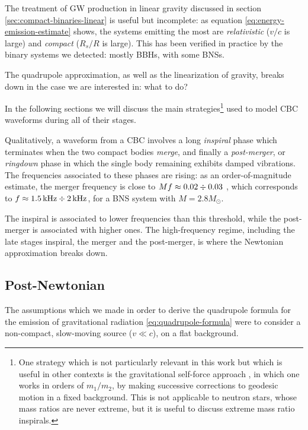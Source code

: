 \documentclass[main.tex]{subfiles}
\begin{document}
The treatment of \ac{GW} production in linear gravity discussed in section \ref{sec:compact-binaries-linear} is useful but incomplete: as equation \eqref{eq:energy-emission-estimate} shows, the systems emitting the most are \emph{relativistic} (\(v/c\) is large) and \emph{compact} (\(R_s / R\) is large). 
This has been verified in practice by the binary systems we detected: mostly \acsp{BBH}, with some \acsp{BNS}.

The quadrupole approximation, as well as the linearization of gravity, breaks down in the case we are interested in: what to do? 

In the following sections we will discuss the main strategies\footnote{One strategy which is not particularly relevant in this work but which is useful in other contexts is the gravitational self-force approach \cite{waldIntroductionGravitationalSelfForce2009}, in which one works in orders of \(m_1 / m_2\), by making successive corrections to geodesic motion in a fixed background. This is not applicable to neutron stars, whose mass ratios are never extreme, but it is useful to discuss extreme mass ratio inspirals.} used to model \ac{CBC} waveforms during all of their stages. 

Qualitatively, a waveform from a \ac{CBC} involves a long \emph{inspiral} phase which terminates when the two compact bodies \emph{merge}, and finally a \emph{post-merger}, or \emph{ringdown} phase in which the single body remaining exhibits damped vibrations.
The frequencies associated to these phases are rising: as an order-of-magnitude estimate, the merger frequency is close to \(Mf \approx 0.02 \divisionsymbol 0.03\) \cite{bernuzziModelingDynamicsTidallyinteracting2015}, which corresponds to \(f \approx \SI{1.5}{kHz} \divisionsymbol \SI{2}{kHz}\), for a \ac{BNS} system with \(M = 2.8 M_{\odot}\). 

The inspiral is associated to lower frequencies than this threshold, while the post-merger is associated with higher ones.
The high-frequency regime, including the late stages inspiral, the merger and the post-merger, is where the Newtonian approximation breaks down.

\subsection{Post-Newtonian} \label{sec:post-newtonian}

The assumptions which we made in order to derive the quadrupole formula for the emission of gravitational radiation \eqref{eq:quadrupole-formula} were to consider a non-compact, slow-moving source (\(v \ll c\)), on a flat background. 
\end{document}
